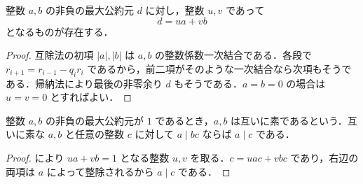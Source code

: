 \begin{prop}
整数 $a,b$ の非負の最大公約元 $d$ に対し，整数 $u,v$ であって
\[
 d=ua+vb
\]
となるものが存在する．
\end{prop}
\begin{proof}
互除法の初項 $|a|,|b|$ は $a,b$ の整数係数一次結合である．各段で $r_{i+1}=r_{i-1}-q_i r_i$ であるから，前二項がそのような一次結合なら次項もそうである．帰納法により最後の非零余り $d$ もそうである．$a=b=0$ の場合は $u=v=0$ とすればよい．
\end{proof}
\begin{prop}[互いに素な整数の整除]
整数 $a,b$ の非負の最大公約元が $1$ であるとき，$a,b$ は互いに素であるという．互いに素な $a,b$ と任意の整数 $c$ に対して $a\mid bc$ ならば $a\mid c$ である．
\end{prop}
\begin{proof}
により $ua+vb=1$ となる整数 $u,v$ を取る．$c=uac+vbc$ であり，右辺の両項は $a$ によって整除されるから $a\mid c$ である．
\end{proof}
